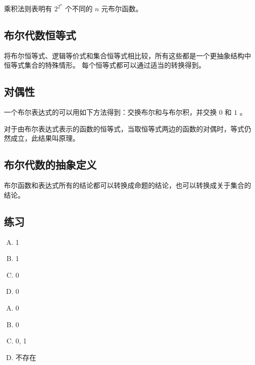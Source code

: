 {{        乘积法则表明有 $2^{2^n}$ 个不同的 $n$ 元布尔函数。
    }

    \subsection{布尔代数恒等式}
    {
        将布尔恒等式、逻辑等价式和集合恒等式相比较，所有这些都是一个更抽象结构中恒等式集合的特殊情形。
        每个恒等式都可以通过适当的转换得到。
    }

    \subsection{对偶性}
    {
        一个布尔表达式的可以用如下方法得到：交换布尔和与布尔积，并交换 $0$ 和 $1$ 。

        对于由布尔表达式表示的函数的恒等式，当取恒等式两边的函数的对偶时，等式仍然成立，此结果叫原理。
    }

    \subsection{布尔代数的抽象定义}
    {
        布尔函数和表达式所有的结论都可以转换成命题的结论，也可以转换成关于集合的结论。
    }

    \subsection{练习}
    {
        \begin{practices}
            \begin{enumerate}[A.]
                \item 1
                \item 1
                \item 0
                \item 0
            \end{enumerate}
        \end{practices}

        \begin{practices}
            \begin{enumerate}[A.]
                \item 0
                \item 0
                \item 0, 1
                \item 不存在
            \end{enumerate}
        \end{practices}

}}

